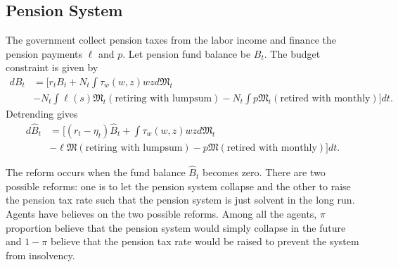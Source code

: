 \documentclass[a4paper, 12pt]{article}
\begin{document}
\subsection{Pension System}
The government collect pension taxes from the labor income and 
finance the pension payments $\ell$ and $p$. Let pension fund balance 
be $B_t$. The budget constraint is given by 
\begin{equation}
    \begin{split}
        dB_t &= \bigg[ r_t B_t + N_t\int \tau_w(w, z)wzd\mathfrak{M}_t \\ 
        &- N_t\int\ell(s)\mathfrak{M}_t(\text{retiring with lumpsum}) - N_t\int p\mathfrak{M}_t(\text{retired with monthly}) \bigg]dt.
    \end{split}
\end{equation}
Detrending gives
\begin{equation}
    \begin{split}
        d\hat{B}_t &= \bigg[ (r_t-\eta_t)\hat{B}_t + \int \tau_w(w, z)wzd\mathfrak{M}_t \\ 
        &- \ell\mathfrak{M}(\text{retiring with lumpsum}) - p\mathfrak{M}(\text{retired with monthly})\bigg]dt.
    \end{split}
\end{equation}

The reform occurs when the fund balance $\hat{B}_t$ becomes 
zero. There are two possible reforms: one is to let the 
pension system collapse and the other to raise the pension 
tax rate such that the pension system is just solvent in the 
long run. Agents have believes on the two possible reforms. 
Among all the agents, $\pi$ proportion believe that 
the pension system would simply collapse in the future 
and $1-\pi$ believe that the pension tax rate would be 
raised to prevent the system from insolvency. 
\end{document}
